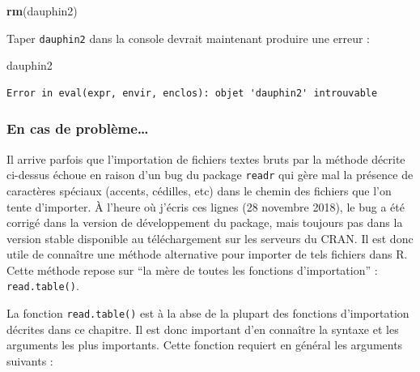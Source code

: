 \documentclass[a4paperpaper,]{article}
\newenvironment{Shaded}{\begin{snugshade}}{\end{snugshade}}
\newcommand{\KeywordTok}[1]{\textcolor[rgb]{0.12,0.11,0.11}{\textbf{#1}}}
\newcommand{\NormalTok}[1]{\textcolor[rgb]{0.12,0.11,0.11}{#1}}
\begin{document}
\begin{Shaded}
\begin{Highlighting}[]
\KeywordTok{rm}\NormalTok{(dauphin2)}
\end{Highlighting}
\end{Shaded}

Taper \texttt{dauphin2} dans la console devrait maintenant produire une erreur :

\begin{Shaded}
\begin{Highlighting}[]
\NormalTok{dauphin2}
\end{Highlighting}
\end{Shaded}

\begin{verbatim}
Error in eval(expr, envir, enclos): objet 'dauphin2' introuvable
\end{verbatim}

\hypertarget{importproblem}{%
\subsubsection{En cas de problème\ldots{}}\label{importproblem}}

Il arrive parfois que l'importation de fichiers textes bruts par la méthode décrite ci-dessus échoue en raison d'un bug du package \texttt{readr} qui gère mal la présence de caractères spéciaux (accents, cédilles, etc) dans le chemin des fichiers que l'on tente d'importer. À l'heure où j'écris ces lignes (28 novembre 2018), le bug a été corrigé dans la version de développement du package, mais toujours pas dans la version stable disponible au téléchargement sur les serveurs du CRAN. Il est donc utile de connaître une méthode alternative pour importer de tels fichiers dans R. Cette méthode repose sur ``la mère de toutes les fonctions d'importation'' : \texttt{read.table()}.

La fonction \texttt{read.table()} est à la abse de la plupart des fonctions d'importation décrites dans ce chapitre. Il est donc important d'en connaître la syntaxe et les arguments les plus importants. Cette fonction requiert en général les arguments suivants :
\end{document}
